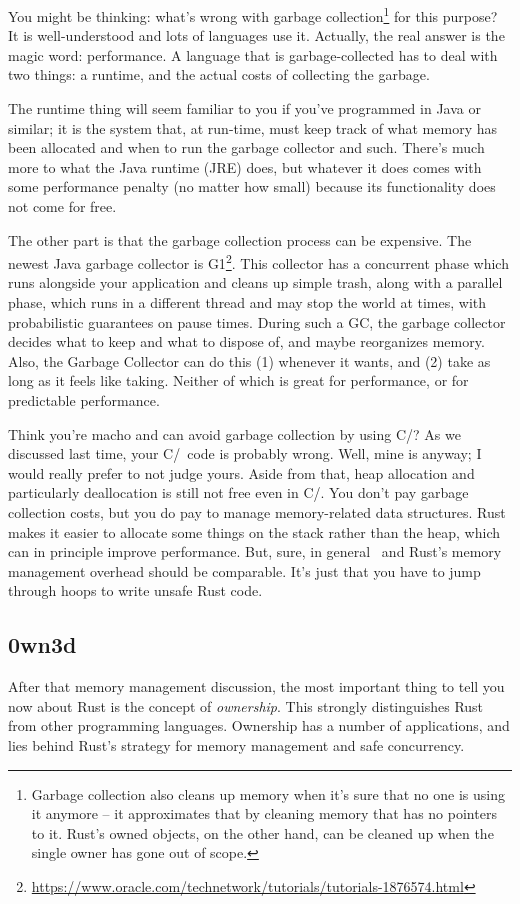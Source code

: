 You might be thinking: what's wrong with garbage collection\footnote{Garbage collection also cleans up memory when it's sure that no one is using it anymore -- it approximates that by cleaning memory that has no pointers to it. Rust's owned objects, on the other hand, can be cleaned up when the single owner has gone out of scope.} for this purpose? It is well-understood and lots of languages use it. Actually, the real answer is the magic word: performance. A language that is garbage-collected has to deal with two things: a runtime, and the actual costs of collecting the garbage.

The runtime thing will seem familiar to you if you've programmed in Java or similar; it is the system that, at run-time, must keep track of what memory has been allocated and when to run the garbage collector and such. There's much more to what the Java runtime (JRE) does, but whatever it does comes with some performance penalty (no matter how small) because its functionality does not come for free. 

The other part is that the garbage collection process can be expensive. The newest Java garbage collector is G1\footnote{\url{https://www.oracle.com/technetwork/tutorials/tutorials-1876574.html}}. This collector has a concurrent phase which runs alongside your application and cleans up simple trash, along with a parallel phase, which runs in a different thread and may stop the world at times, with probabilistic guarantees on pause times. During such a GC, the garbage collector decides what to keep and what to dispose of, and maybe reorganizes memory. Also, the Garbage Collector can do this (1) whenever it wants, and (2) take as long as it feels like taking. Neither of which is great for performance, or for predictable performance.

Think you're macho and can avoid garbage collection by using C/\CPP? As we discussed last time, your C/\CPP~code is probably wrong. Well, mine is anyway; I would really prefer to not judge yours. Aside from that, heap allocation and particularly deallocation is still not free even in C/\CPP. You don't pay garbage collection costs, but you do pay to manage memory-related data structures. Rust makes it easier to allocate some things on the stack rather than the heap, which can in principle improve performance. But, sure, in general \CPP~and Rust's memory management overhead should be comparable. It's just that you have to jump through hoops to write unsafe Rust code.

\subsection*{0wn3d} After that memory management discussion, the most important thing to tell you now about Rust is the concept of \textit{ownership}. This strongly distinguishes Rust from other programming languages. Ownership has a number of applications, and lies behind Rust's strategy for memory management and safe concurrency.

